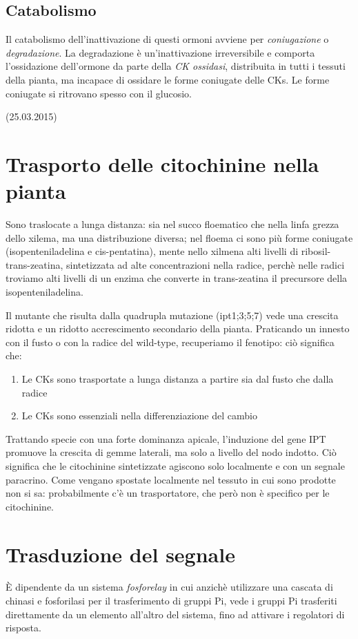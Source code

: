 \documentclass[a4paper,12pt]{book}
\begin{document}
\subsection{Catabolismo}
Il catabolismo dell'inattivazione di questi ormoni avviene per \emph{coniugazione} o \emph{degradazione}. La degradazione è un'inattivazione irreversibile e comporta l'ossidazione dell'ormone da parte della \emph{CK ossidasi}, distribuita in tutti i tessuti della pianta, ma incapace di ossidare le forme coniugate delle CKs. Le forme coniugate si ritrovano spesso con il glucosio.

(25.03.2015)

\section{Trasporto delle citochinine nella pianta}
Sono traslocate a lunga distanza: sia nel succo floematico che nella linfa grezza dello xilema, ma una distribuzione diversa; nel floema ci sono più forme coniugate (isopenteniladelina e cis-pentatina), mente nello xilmena alti livelli di ribosil-trans-zeatina, sintetizzata ad alte concentrazioni nella radice, perchè nelle radici troviamo alti livelli di un enzima che converte in trans-zeatina il precursore della isopenteniladelina.

Il mutante che risulta dalla quadrupla mutazione (ipt1;3;5;7) vede una crescita ridotta e un ridotto accrescimento secondario della pianta. Praticando un innesto con il fusto o con la radice del wild-type, recuperiamo il fenotipo: ciò significa che:
\begin{enumerate}
\item{Le CKs sono trasportate a lunga distanza a partire sia dal fusto che dalla radice}
\item{Le CKs sono essenziali nella differenziazione del cambio}
\end{enumerate}

Trattando specie con una forte dominanza apicale, l'induzione del gene IPT promuove la crescita di gemme laterali, ma solo a livello del nodo indotto. Ciò significa che le citochinine sintetizzate agiscono solo localmente e con un segnale paracrino. Come vengano spostate localmente nel tessuto in cui sono prodotte non si sa: probabilmente c'è un trasportatore, che però non è specifico per le citochinine.

\section{Trasduzione del segnale}
È dipendente da un sistema \emph{fosforelay} in cui anzichè utilizzare una cascata di chinasi e fosforilasi per il trasferimento di gruppi Pi, vede i gruppi Pi trasferiti direttamente da un elemento all'altro del sistema, fino ad attivare i regolatori di risposta.
\end{document}
